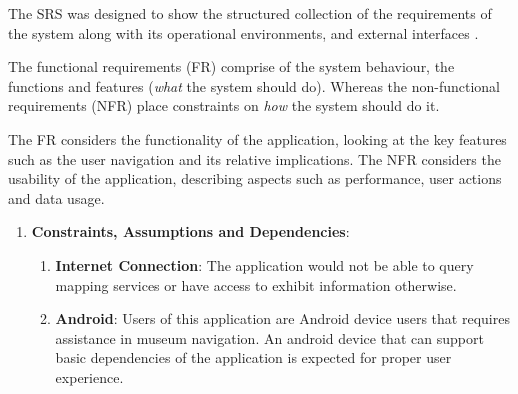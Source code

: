 

The SRS was designed to show the structured collection of the requirements of the system along with its operational environments, and external interfaces \cite{IEEE24765}. 

The functional requirements (FR) comprise of the system behaviour, the functions and features (\textit{what} the system should do). Whereas the non-functional requirements (NFR) place constraints on \textit{how} the system should do it.

The FR considers the functionality of the application, looking at the key features such as the user navigation and its relative implications. The NFR considers the usability of the application, describing aspects such as performance, user actions and data usage.

\begin{enumerate}

    \item \textbf{Constraints, Assumptions and Dependencies}:
    \begin{enumerate}
        \item \textbf{Internet Connection}: The application would not be able to query mapping services or have access to exhibit information otherwise.
        \item \textbf{Android}: Users of this application are Android device users that requires assistance in museum navigation. An android device that can support basic dependencies of the application is expected for proper user experience.
    \end{enumerate}
    
\end{enumerate}